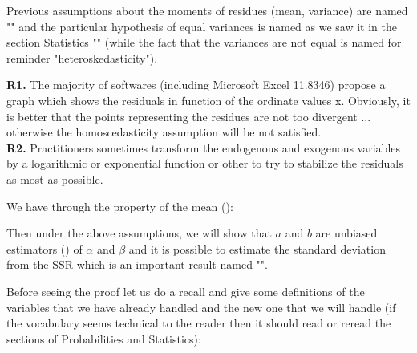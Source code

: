 	Previous assumptions about the moments of residues (mean, variance) are named "" and the particular hypothesis of equal variances is named as we saw it in the section Statistics "" (while the fact that the variances are not equal is named for reminder "heteroskedasticity").

	\begin{tcolorbox}[title=Remarks,colframe=black,arc=10pt]
\textbf{R1. }The majority of softwares (including Microsoft Excel 11.8346) propose a graph which shows the residuals in function of the ordinate values x. Obviously, it is better that the points representing the residues are not too divergent ... otherwise the homoscedasticity assumption will be not satisfied.\\

\textbf{R2.} Practitioners sometimes transform the endogenous and exogenous variables by a logarithmic or exponential function or other to try to stabilize the residuals as most as possible.
	\end{tcolorbox}	
	
	\begin{theorem}
	We have through the property of the mean ():
	
	\end{theorem}
	Then under the above assumptions, we will show that $a$ and $b$ are unbiased estimators () of $\alpha$ and $\beta$ and it is possible to estimate the standard deviation from the SSR which is an important result named "".
	
	Before seeing the proof let us do a recall and give some definitions of the variables that we have already handled and the new one that we will handle (if the vocabulary seems technical to the reader then it should read or reread the sections of Probabilities and Statistics):
	
